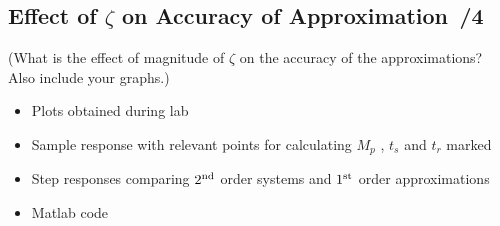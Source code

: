 \documentclass{article}
\newcommand{\score}{\hfill \underline{\hspace{0.65cm}}\,/} %
\begin{document}
\subsection*{Effect of $\zeta$ on Accuracy of Approximation \score 4}
(What is the effect of magnitude of $\zeta$ on the accuracy of the approximations? Also include your graphs.)
\newline \\[10mm]
\begin{itemize}
\item Plots obtained during lab
\item Sample response with relevant points for calculating $M_p$ , $t_s$ and $t_r$ marked
\item Step responses comparing $2^{\rm nd}$ order systems and $1^{\rm st}$ order approximations
\item {\sc Matlab} code
\end{itemize}
\end{document}
